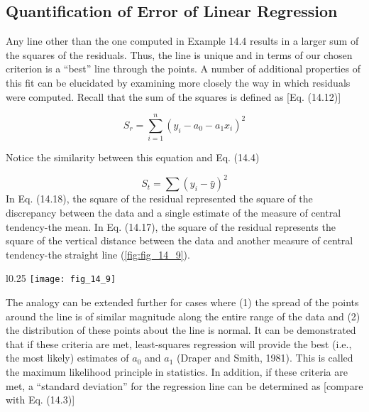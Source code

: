 \documentclass[../main.tex]{subfiles}
\begin{document}
\label{cha:cha_P_14_3_3}
\subsection{Quantification of Error of Linear Regression}

\noindent Any line other than the one computed in Example 14.4 results in a larger sum of the squares of the residuals. Thus, the line is unique and in terms of our chosen criterion is a ``best'' line through the points. A number of additional properties of this fit can be elucidated by examining more closely the way in which residuals were computed. Recall that the sum of the squares is defined as [Eq. (14.12)]

\begin{equation}
	\tag{14.17}
	S_r = \sum^n_{i=1} (y_i - a_0 - a_1 x_i)^2
\end{equation}

Notice the similarity between this equation and Eq. (14.4)

\begin{equation}
\tag{14.18}
S_t = \sum (y_i - \bar{y})^2
\end{equation}
In Eq. (14.18), the square of the residual represented the square of the discrepancy between the data and a single estimate of the measure of central tendency-the mean. In Eq. (14.17), the square of the residual represents the square of the vertical distance between the data and another measure of central tendency-the straight line (\ref{fig:fig_14_9}).

\begin{wrapfigure}{l}{0.25\textwidth}
    \centering
    \texttt{[image: fig\_14\_9]}
   \caption{\textsf{The residual in linear regression represents the vertical distance between a data point and the straight line.}}
   \label{fig:fig_14_9}
\end{wrapfigure}

The analogy can be extended further for cases where (1) the spread of the points around the line is of similar magnitude along the entire range of the data and (2) the distribution of these points about the line is normal. It can be demonstrated that if these criteria are met, least-squares regression will provide the best (i.e., the most likely) estimates of $a_0$ and $a_1$ (Draper and Smith, 1981). This is called the maximum likelihood principle in statistics. In addition, if these criteria are met, a ``standard deviation'' for the regression line can be determined as [compare with Eq. (14.3)]
\end{document}
